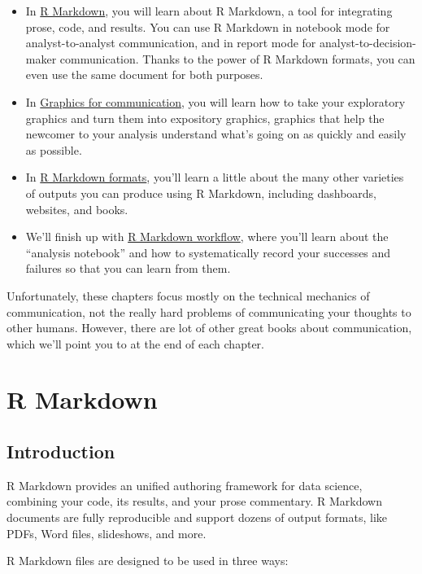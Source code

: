 \documentclass[]{book}
\begin{document}
\begin{itemize}
\item
  In \protect\hyperlink{r-markdown}{R Markdown}, you will learn about R
  Markdown, a tool for integrating prose, code, and results. You can use
  R Markdown in notebook mode for analyst-to-analyst communication, and
  in report mode for analyst-to-decision-maker communication. Thanks to
  the power of R Markdown formats, you can even use the same document
  for both purposes.
\item
  In \protect\hyperlink{graphics-for-communication}{Graphics for
  communication}, you will learn how to take your exploratory graphics
  and turn them into expository graphics, graphics that help the
  newcomer to your analysis understand what's going on as quickly and
  easily as possible.
\item
  In \protect\hyperlink{r-markdown-formats}{R Markdown formats}, you'll
  learn a little about the many other varieties of outputs you can
  produce using R Markdown, including dashboards, websites, and books.
\item
  We'll finish up with \protect\hyperlink{r-markdown-workflow}{R
  Markdown workflow}, where you'll learn about the ``analysis notebook''
  and how to systematically record your successes and failures so that
  you can learn from them.
\end{itemize}

Unfortunately, these chapters focus mostly on the technical mechanics of
communication, not the really hard problems of communicating your
thoughts to other humans. However, there are lot of other great books
about communication, which we'll point you to at the end of each
chapter.

\hypertarget{r-markdown}{\chapter{R Markdown}\label{r-markdown}}

\section{Introduction}\label{introduction-18}

R Markdown provides an unified authoring framework for data science,
combining your code, its results, and your prose commentary. R Markdown
documents are fully reproducible and support dozens of output formats,
like PDFs, Word files, slideshows, and more.

R Markdown files are designed to be used in three ways:
\end{document}
